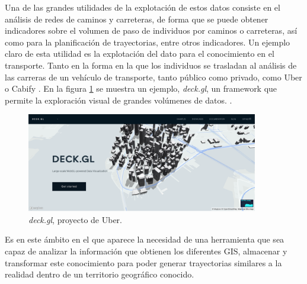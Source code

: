 Una de las grandes utilidades de la explotación de estos datos consiste en el análisis de 
redes de caminos y carreteras, de forma que se puede obtener indicadores sobre el 
volumen de paso de individuos por caminos o carreteras, así como para la planificación 
de trayectorias, entre otros indicadores. Un ejemplo claro de esta utilidad es la 
explotación del dato para el conocimiento en el transporte.  Tanto en la forma en la que 
los individuos se trasladan al análisis de las carreras de un vehículo de transporte, tanto 
público como privado, como Uber o Cabify \cite{Viskic01}. En la figura 
\ref{figure:UberGL} se muestra un ejemplo, \textit{deck.gl}, un framework que permite 
la exploración visual de grandes volúmenes de datos. \cite{Uber01}.
\begin{figure}[!htb]
\begin{center}
\includegraphics[width=0.9\textwidth]{./Imagenes/UberGL.png}
\caption{\textit{deck.gl}, proyecto de Uber.}
\label{figure:UberGL}
\end{center}
\end{figure}
\newpage
Es en este ámbito en el que aparece la necesidad de una herramienta que sea capaz de 
analizar la información que obtienen los diferentes \ac{GIS}, almacenar y transformar 
este conocimiento para poder generar trayectorias similares a la realidad dentro de un 
territorio geográfico conocido.

